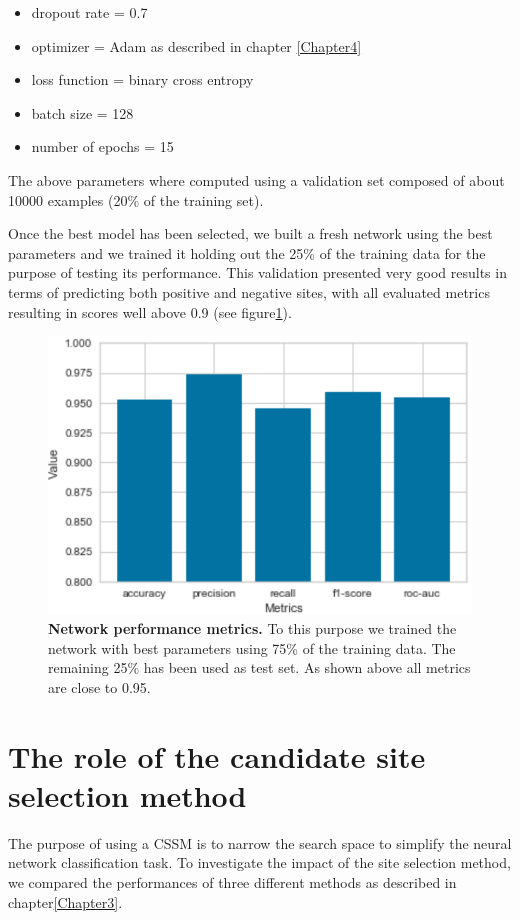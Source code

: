 \begin{itemize}
	\item dropout rate = 0.7
	\item optimizer = Adam as described in chapter \ref{Chapter4}
	\item loss function = binary cross entropy
	\item batch size = 128
	\item number of epochs = 15
\end{itemize}

The above parameters where computed using a validation set composed of about 10000 examples (20\% of the training set).

Once the best model has been selected, we built a fresh network using the best parameters and we trained it holding out the 25\% of the training data for the purpose of testing its performance. This validation presented very good results in terms of predicting both positive and negative sites, with all evaluated metrics resulting in scores well above 0.9 (see figure\ref{fig:network_evaluation}).

\begin{figure}[hbt!]
	\centering
	\includegraphics[width=\textwidth]{Figures/network_evaluation}
	\caption{\textbf{Network performance metrics.} To this purpose we trained the network with best parameters using 75\% of the training data. The remaining 25\% has been used as test set. As shown above all metrics are close to 0.95.}
	\label{fig:network_evaluation}
\end{figure}

\section{The role of the candidate site selection method}
The purpose of using a CSSM is to narrow the search space to simplify the neural network classification task. To investigate the impact of the site selection method, we compared the performances of three different methods as described in chapter\ref{Chapter3}. 

